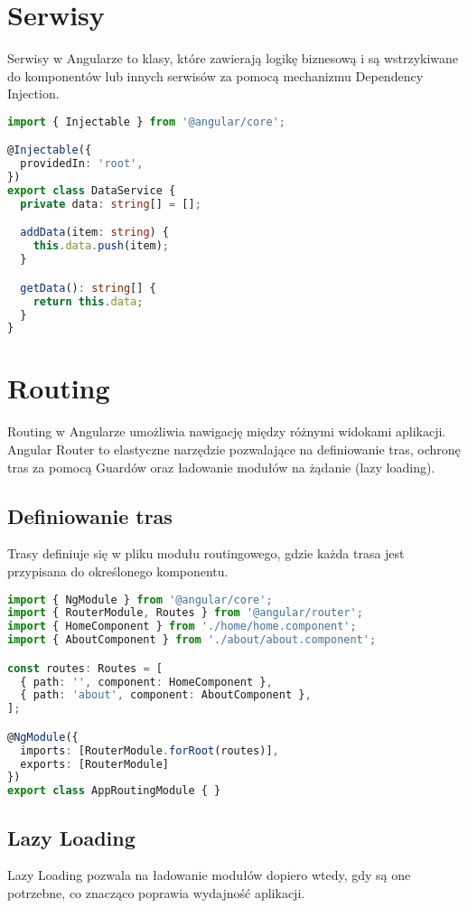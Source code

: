 \documentclass[a4paper,12pt]{article}
\begin{document}
\section{Serwisy}
Serwisy w Angularze to klasy, które zawierają logikę biznesową i są wstrzykiwane do komponentów lub innych serwisów za pomocą mechanizmu Dependency Injection.

\begin{lstlisting}[language=TypeScript, caption=Przykładowy serwis w Angularze]
import { Injectable } from '@angular/core';

@Injectable({
  providedIn: 'root',
})
export class DataService {
  private data: string[] = [];

  addData(item: string) {
    this.data.push(item);
  }

  getData(): string[] {
    return this.data;
  }
}
\end{lstlisting}

\section{Routing}
Routing w Angularze umożliwia nawigację między różnymi widokami aplikacji. Angular Router to elastyczne narzędzie pozwalające na definiowanie tras, ochronę tras za pomocą Guardów oraz ładowanie modułów na żądanie (lazy loading).

\subsection{Definiowanie tras}
Trasy definiuje się w pliku modułu routingowego, gdzie każda trasa jest przypisana do określonego komponentu.

\begin{lstlisting}[language=TypeScript, caption=Przykład konfiguracji tras]
import { NgModule } from '@angular/core';
import { RouterModule, Routes } from '@angular/router';
import { HomeComponent } from './home/home.component';
import { AboutComponent } from './about/about.component';

const routes: Routes = [
  { path: '', component: HomeComponent },
  { path: 'about', component: AboutComponent },
];

@NgModule({
  imports: [RouterModule.forRoot(routes)],
  exports: [RouterModule]
})
export class AppRoutingModule { }
\end{lstlisting}

\subsection{Lazy Loading}
Lazy Loading pozwala na ładowanie modułów dopiero wtedy, gdy są one potrzebne, co znacząco poprawia wydajność aplikacji.
\end{document}
